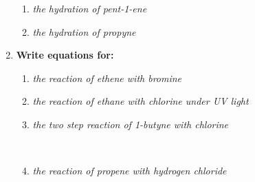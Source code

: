 \documentclass{report}
\begin{document}
\begin{enumerate}
			\begin{enumerate}
				\item \textit{the hydration of pent-1-ene}

					\begin{center}
					\end{center}

				\item \textit{the hydration of propyne}

					\begin{center}
					\end{center}
			\end{enumerate}

		\item \textbf{Write equations for:}

			\begin{enumerate}
				\item \textit{the reaction of ethene with bromine}
					
					\begin{center}
					\end{center}

				\item \textit{the reaction of ethane with chlorine under UV light}

					\begin{center}
					\end{center}

				\item \textit{the two step reaction of 1-butyne with chlorine}

					\begin{center}
					\end{center}
					\\
					\begin{center}
					\end{center}

				\item \textit{the reaction of propene with hydrogen chloride}


\end{enumerate}
\end{enumerate}
\end{document}
